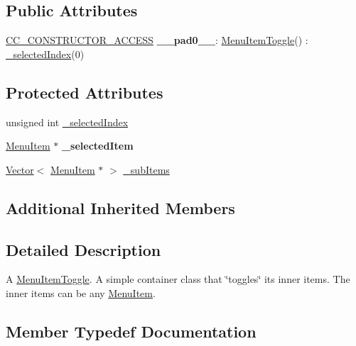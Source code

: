 \subsection*{Public Attributes}
\begin{DoxyCompactItemize}
\item 
\mbox{\label{classMenuItemToggle_ad70ab4a62246b239e8b67025df5293c8}} 
\hyperlink{_2cocos2d_2cocos_2base_2ccConfig_8h_a25ef1314f97c35a2ed3d029b0ead6da0}{C\+C\+\_\+\+C\+O\+N\+S\+T\+R\+U\+C\+T\+O\+R\+\_\+\+A\+C\+C\+E\+SS} {\bfseries \+\_\+\+\_\+pad0\+\_\+\+\_\+}\+: \hyperlink{classMenuItemToggle}{Menu\+Item\+Toggle}() \+: \hyperlink{classMenuItemToggle_a28bf660bc45cb46f525741d7288bbba1}{\+\_\+selected\+Index}(0)
\end{DoxyCompactItemize}
\subsection*{Protected Attributes}
\begin{DoxyCompactItemize}
\item 
unsigned int \hyperlink{classMenuItemToggle_a28bf660bc45cb46f525741d7288bbba1}{\+\_\+selected\+Index}
\item 
\mbox{\label{classMenuItemToggle_a1897318bf8ddc42e4cb4ffbedad8adaa}} 
\hyperlink{classMenuItem}{Menu\+Item} $\ast$ {\bfseries \+\_\+selected\+Item}
\item 
\hyperlink{classVector}{Vector}$<$ \hyperlink{classMenuItem}{Menu\+Item} $\ast$ $>$ \hyperlink{classMenuItemToggle_ae4aca3a1128d6c460179c1a53054d51f}{\+\_\+sub\+Items}
\end{DoxyCompactItemize}
\subsection*{Additional Inherited Members}


\subsection{Detailed Description}
A \hyperlink{classMenuItemToggle}{Menu\+Item\+Toggle}. A simple container class that \char`\"{}toggles\char`\"{} it\textquotesingle{}s inner items. The inner items can be any \hyperlink{classMenuItem}{Menu\+Item}. 

\subsection{Member Typedef Documentation}
\mbox{\label{classMenuItemToggle_a4f44d80e256ed59e1994b4a04f009903}} 
